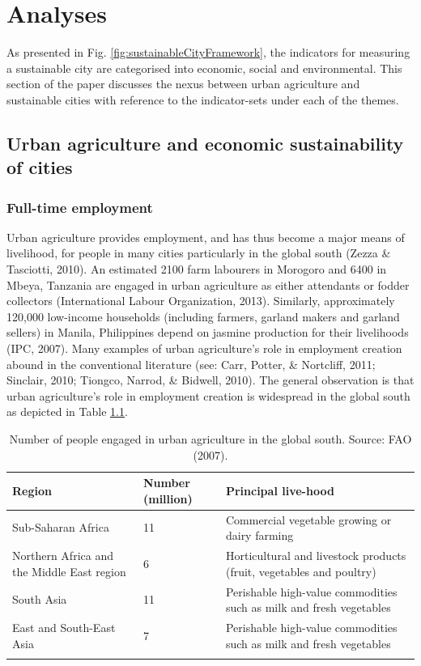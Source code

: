 \chapter{Analyses} %

\label{Chapter:Analyses}

As presented in Fig. \ref{fig:sustainableCityFramework}, the indicators for measuring a sustainable city are categorised into economic, social and environmental. This section of the paper discusses the nexus between urban agriculture and sustainable cities with reference to the indicator-sets under each of the themes.

\section{Urban agriculture and economic sustainability of cities}

\subsection{Full-time employment}

Urban agriculture provides employment, and has thus become a major means of livelihood, for people in many cities particularly in the global south \cite{Kodjo2014} (Zezza \& Tasciotti, 2010). An estimated 2100 farm labourers in Morogoro and 6400 in Mbeya, Tanzania are engaged in urban agriculture as either attendants or fodder collectors (International Labour Organization, 2013). Similarly, approximately 120,000 low-income households (including farmers, garland makers and garland sellers) in Manila, Philippines depend on jasmine production for their livelihoods (IPC, 2007). Many examples of urban agriculture's role in employment creation abound in the conventional literature (see: \cite{Amponsah2016} Carr, Potter, \& Nortcliff, 2011; Sinclair, 2010; Tiongco, Narrod, \& Bidwell, 2010). The general observation is that urban agriculture's role in employment creation is widespread in the global south as depicted in Table \ref{tbl:peopleEngagedInUA}.

\begin{table}[th]
\caption{Number of people engaged in urban agriculture in the global south. Source: FAO (2007).}
\begin{center}
\begin{tabular}{ p{} p{} p{} } 
\hline
Region & Number (million) & Principal live-hood \\
\hline
Sub-Saharan Africa & 11 & Commercial vegetable growing or dairy farming \\
Northern Africa and the Middle East region & 6 & Horticultural and livestock products (fruit, vegetables and poultry) \\
South Asia & 11 & Perishable high-value commodities such as milk and fresh vegetables \\
East and South-East Asia & 7 & Perishable high-value commodities such as milk and fresh vegetables \\
\hline
\label{tbl:peopleEngagedInUA}
\end{tabular}
\end{center}
\end{table}

